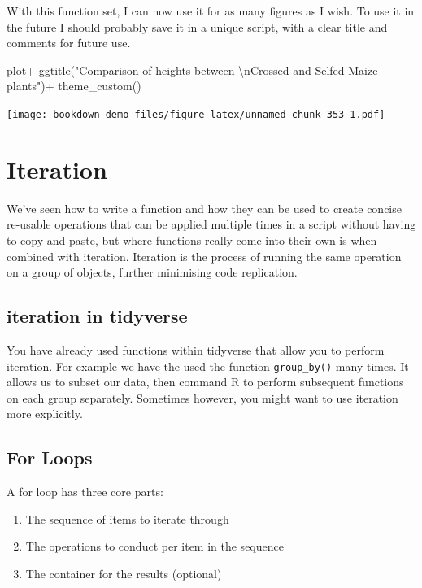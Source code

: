 \documentclass[
]{book}
\newenvironment{Shaded}{\begin{snugshade}}{\end{snugshade}}
\newcommand{\FunctionTok}[1]{\textcolor[rgb]{0.00,0.00,0.00}{#1}}
\newcommand{\NormalTok}[1]{#1}
\newcommand{\SpecialCharTok}[1]{\textcolor[rgb]{0.00,0.00,0.00}{#1}}
\newcommand{\StringTok}[1]{\textcolor[rgb]{0.31,0.60,0.02}{#1}}
\begin{document}
With this function set, I can now use it for as many figures as I wish. To use it in the future I should probably save it in a unique script, with a clear title and comments for future use.

\begin{Shaded}
\begin{Highlighting}[]
\NormalTok{plot}\SpecialCharTok{+}
\FunctionTok{ggtitle}\NormalTok{(}\StringTok{"Comparison of heights between }\SpecialCharTok{\textbackslash{}n}\StringTok{Crossed and Selfed Maize plants"}\NormalTok{)}\SpecialCharTok{+}
\FunctionTok{theme\_custom}\NormalTok{()}
\end{Highlighting}
\end{Shaded}

\texttt{[image: bookdown-demo\_files/figure-latex/unnamed-chunk-353-1.pdf]}

\hypertarget{iteration}{%
\section{Iteration}\label{iteration}}

We've seen how to write a function and how they can be used to create concise re-usable operations that can be applied multiple times in a script without having to copy and paste, but where functions really come into their own is when combined with iteration. Iteration is the process of running the same operation on a group of objects, further minimising code replication.

\hypertarget{iteration-in-tidyverse}{%
\subsection{iteration in tidyverse}\label{iteration-in-tidyverse}}

You have already used functions within tidyverse that allow you to perform iteration. For example we have the used the function \texttt{group\_by()} many times. It allows us to subset our data, then command R to perform subsequent functions on each group separately. Sometimes however, you might want to use iteration more explicitly.

\hypertarget{for-loops}{%
\subsection{For Loops}\label{for-loops}}

A for loop has three core parts:

\begin{enumerate}
\def\labelenumi{\arabic{enumi})}
\item
  The sequence of items to iterate through
\item
  The operations to conduct per item in the sequence
\item
  The container for the results (optional)
\end{enumerate}
\end{document}
